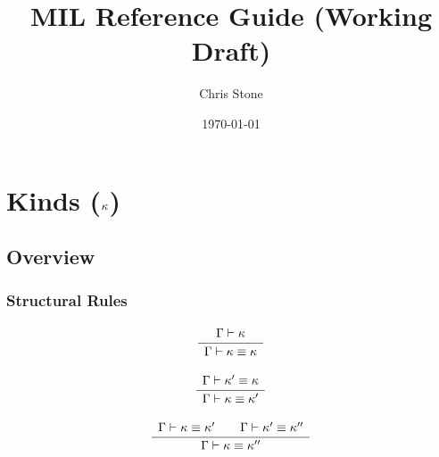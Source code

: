 \documentclass[12pt,twoside,fleqn]{article}
\title{MIL Reference Guide (Working Draft)}
\author{Chris Stone}
\date{\today}
\begin{document}
\maketitle
\raggedbottom

\newcommand{\translate}[1]{\langle{#1}\rangle}
\newcommand{\describe}[7]{
  \subsubsection{#1}
  \begin{supertabular}{p{0.8truein}p{5truein}}
  Description&#2\\
  Greek&\rightskip=0pt plus5em $ #3 $\\
  Datatype&\rightskip=0pt plus5em\textcd{#4}\\
  PP&\textcd{#5}\\
  Note&#6\\
  Rules&#7\\
\end{supertabular}
\filbreak}
  

\newcommand{\irule}[2]
{  \[
    \frac{\begin{array}{c}
              #1
          \end{array}}
         {\begin{array}{c}
              #2
          \end{array}}
  \]}
\newcommand{\allarrowmil}[6]{\forall(#1).(#2;#3)\to^{#4,#5}#6}


\section{Kinds ($\kappa$)} 

\subsection{Overview}

\subsubsection{Structural Rules}

\irule
  {\validkind{\context}{\kind}}
  {\equivkind{\context}{\kind}{\kind}}

\irule
  {\equivkind{\context}{\kind'}{\kind}}
  {\equivkind{\context}{\kind}{\kind'}}

\irule
  {\equivkind{\context}{\kind}{\kind'}\qquad
   \equivkind{\context}{\kind'}{\kind''}}
  {\equivkind{\context}{\kind}{\kind''}}
\end{document}
